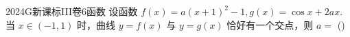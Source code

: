
\begin{problem}{2024}{G}{新课标III卷}{6}{函数}
设函数 $f(x)=a(x+1)^2-1, g(x)=\cos x+2ax$. 当 $x\in(-1,1)$ 时，曲线 $y=f(x)$ 与 $y=g(x)$ 恰好有一个交点，则 $a=$
(\hspace{1cm})
\begin{choices}
\end{choices}
\end{problem}